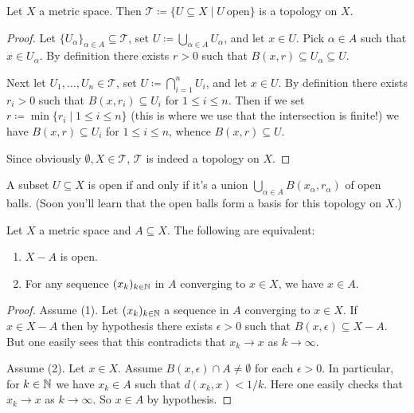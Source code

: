 \begin{proposition}
  Let $X$ a metric space. Then $\mathcal{T} \coloneqq \{U \subseteq X
  \mid U\ \text{open}\}$ is a topology on $X$.
\end{proposition}

\begin{proof}
  Let $\{U_\alpha\}_{\alpha \in A} \subseteq \mathcal{T}$, set $U
  \coloneqq \bigcup_{\alpha \in A} U_\alpha$, and let $x \in U$. Pick
  $\alpha \in A$ such that $x \in U_\alpha$. By definition there
  exists $r > 0$ such that $B(x,r) \subseteq U_\alpha \subseteq U$.

  \medskip
  Next let $U_1,\ldots,U_n \in \mathcal{T}$, set $U \coloneqq
  \bigcap_{i=1}^n U_i$, and let $x \in U$. By definition there exists
  $r_i > 0$ such that $B(x,r_i) \subseteq U_i$ for $1 \le i \le
  n$. Then if we set $r \coloneqq \min \{r_i \mid 1 \le i \le n\}$
  (this is where we use that the intersection is finite!) we have
  $B(x,r) \subseteq U_i$ for $1 \le i \le n$, whence $B(x,r) \subseteq
  U$.

  \medskip
  Since obviously $\emptyset, X \in \mathcal{T}$, $\mathcal{T}$ is
  indeed a topology on $X$.
\end{proof}

\begin{exercise}
  \label{unionofballs}
  A subset $U \subseteq X$ is open if and only if it's a union
  $\bigcup_{\alpha \in A} B(x_\alpha, r_\alpha)$ of open balls. (Soon
  you'll learn that the open balls form a \textup{basis} for this
  topology on $X$.)
\end{exercise}

\begin{proposition}
  Let $X$ a metric space and $A \subseteq X$. The following are
  equivalent:
  \begin{enumerate}
  \item $X - A$ is open.
  \item For any sequence $(x_k)_{k \in \mathbb{N}}$ in $A$ converging to $x
    \in X$, we have $x \in A$.
  \end{enumerate}
\end{proposition}

\begin{proof}
  Assume (1). Let $(x_k)_{k \in \mathbb{N}}$ a sequence in $A$ converging to
  $x \in X$. If $x \in X - A$ then by hypothesis there exists
  $\epsilon > 0$ such that $B(x, \epsilon) \subseteq X - A$. But one
  easily sees that this contradicts that $x_k \to x$ as $k \to
  \infty$.

  \medskip
  Assume (2). Let $x \in X$. Assume $B(x,\epsilon) \cap A \ne
  \emptyset$ for each $\epsilon > 0$. In particular, for $k \in \mathbb{N}$ we
  have $x_k \in A$ such that $d(x_k,x) < 1/k$. Here one easily checks
  that $x_k \to x$ as $k \to \infty$. So $x \in A$ by hypothesis.
\end{proof}

